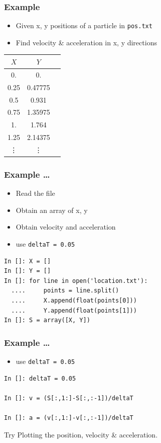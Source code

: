 \documentclass[14pt,compress]{beamer}
\newcommand{\typ}[1]{\lstinline{#1}}
\begin{document}
\begin{frame}[fragile]
\frametitle{Example}
\begin{itemize}
\item Given x, y positions of a particle in \typ{pos.txt}
\item Find velocity \& acceleration in x, y directions
\end{itemize}
\small{
\begin{center}
\begin{tabular}{| c | c | c |}
\hline
$X$ & $Y$ \\ \hline
0.     &  0.\\ \hline
0.25   &  0.47775\\ \hline
0.5    &  0.931\\ \hline
0.75   &  1.35975\\ \hline
1.     &  1.764\\ \hline
1.25   &  2.14375\\ \hline
\vdots & \vdots\\ \hline
\end{tabular}
\end{center}}
\end{frame}

\begin{frame}[fragile]
\frametitle{Example \ldots}
\begin{itemize}
\item Read the file
\item Obtain an array of x, y
\item Obtain velocity and acceleration
\item use \typ{deltaT = 0.05}
\end{itemize}
\begin{lstlisting}
In []: X = []
In []: Y = []
In []: for line in open('location.txt'):
  ....     points = line.split()
  ....     X.append(float(points[0]))
  ....     Y.append(float(points[1]))
In []: S = array([X, Y])
\end{lstlisting}
\end{frame}


\begin{frame}[fragile]
\frametitle{Example \ldots}
\begin{itemize}
\item use \typ{deltaT = 0.05}
\end{itemize}
\begin{lstlisting}
In []: deltaT = 0.05

In []: v = (S[:,1:]-S[:,:-1])/deltaT

In []: a = (v[:,1:]-v[:,:-1])/deltaT
\end{lstlisting}
Try Plotting the position, velocity \& acceleration.
\end{frame}
\end{document}
